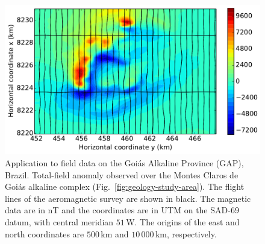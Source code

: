 \documentclass[journal abbreviation, npg]{copernicus}
\providecommand{\DIFaddbegin}{} %
\providecommand{\DIFaddend}{} %
\providecommand{\DIFaddbeginFL}{} %
\providecommand{\DIFaddendFL}{} %
\providecommand{\DIFdelbeginFL}{} %
\providecommand{\DIFdelendFL}{} %
\begin{document}
\DIFaddend \begin{figure}[t]
  \DIFdelbeginFL %
\DIFdelendFL \DIFaddbeginFL \includegraphics[width=120mm]{Figures/npgd-2014-0069-f17}
  \DIFaddendFL \caption{Application to field data on the Goi\'{a}s Alkaline Province
    (GAP), Brazil. Total-field anomaly observed over the Montes Claros
    de Goi\'{a}s alkaline complex
    (Fig.~\ref{fig:geology-study-area}). The flight lines of the
    aeromagnetic survey are shown in black. The magnetic data are in nT
    and the coordinates are in UTM on the SAD-69 datum, with central
    meridian $51${\degree}\,W. The origins of the east and north
    coordinates are $500$\,\unit{km} and $10\,000$\,\unit{km},
    respectively. }
\label{fig:TFA-MCG}
\end{figure}

\DIFaddbegin \clearpage
\end{document}
